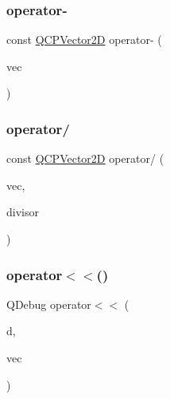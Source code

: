 \mbox{\label{class_q_c_p_vector2_d_a14c807d345ee3f22d6809bb5a4137b52}} 
\subsubsection{\texorpdfstring{operator-\/}{operator-}\hspace{0.1cm}{\footnotesize\ttfamily [2/2]}}
{\footnotesize\ttfamily const \hyperlink{class_q_c_p_vector2_d}{Q\+C\+P\+Vector2D} operator-\/ (\begin{DoxyParamCaption}\item[{const \hyperlink{class_q_c_p_vector2_d}{Q\+C\+P\+Vector2D} \&}]{vec }\end{DoxyParamCaption})\hspace{0.3cm}{\ttfamily [friend]}}

\mbox{\label{class_q_c_p_vector2_d_aa69909afc8c656999a2ea292ea01244b}} 
\subsubsection{\texorpdfstring{operator/}{operator/}}
{\footnotesize\ttfamily const \hyperlink{class_q_c_p_vector2_d}{Q\+C\+P\+Vector2D} operator/ (\begin{DoxyParamCaption}\item[{const \hyperlink{class_q_c_p_vector2_d}{Q\+C\+P\+Vector2D} \&}]{vec,  }\item[{double}]{divisor }\end{DoxyParamCaption})\hspace{0.3cm}{\ttfamily [friend]}}

\mbox{\label{class_q_c_p_vector2_d_a6c757af9671d925af4a36c2f58fb7234}} 
\subsubsection{\texorpdfstring{operator$<$$<$()}{operator<<()}}
{\footnotesize\ttfamily Q\+Debug operator$<$$<$ (\begin{DoxyParamCaption}\item[{Q\+Debug}]{d,  }\item[{const \hyperlink{class_q_c_p_vector2_d}{Q\+C\+P\+Vector2D} \&}]{vec }\end{DoxyParamCaption})\hspace{0.3cm}{\ttfamily [related]}}

